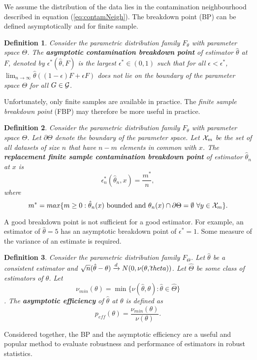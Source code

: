 We assume the distribution of the data lies in the contamination neighbourhood described in equation (\ref{eq:contamNeigh}). The breakdown point (BP) can be defined asymptotically and for finite sample.
\newtheorem{defn}{Definition}[section]
\begin{defn}
\label{def:asympBP}
Consider the parametric distribution family $F_\theta$ with parameter space $\Theta$. The \textbf{asymptotic contamination breakdown point} of estimator $\hat \theta$ at $F$, denoted by $\epsilon^*(\hat \theta, F)$ is the largest  $\epsilon^* \in (0,1)$ such that for all $\epsilon < \epsilon^*$, $\lim_{n\xrightarrow{}\infty}\hat\theta((1-\epsilon)F + \epsilon F)$ does not lie on the boundary of the parameter space $\Theta$ for all $G \in \mathcal{G}$. \cite{maronna2019robust}
\end{defn}
Unfortunately, only finite samples are available in practice. The \textit{finite sample breakdown point} (FBP) may therefore be more useful in practice.
\begin{defn}
\label{def:finiteBP}
Consider the parametric distribution family $F_\theta$ with parameter space $\Theta$. Let $\partial \Theta$ denote the boundary of the parameter space. Let $\mathcal{X}_m$ be the set of all datasets of size $n$ that have $n-m$ elements in common with $x$. The \textbf{replacement finite sample contamination breakdown point} of estimator $\hat \theta_n$ at $x$ is $$\epsilon_n^*(\hat \theta_n, x) = \frac{m^*}{n},$$ where
$$m^* = max\{ m \geq 0 : \hat \theta_n(x) \text{ bounded and } \theta_n(x) \cap \partial \Theta = \emptyset\ \forall y \in \mathcal{X}_m\}.$$ \cite{maronna2019robust}
\end{defn}
A good breakdown point is not sufficient for a good estimator. For example, an estimator of $\hat \theta = 5$ has an asymptotic breakdown point of $\epsilon^* = 1$. Some measure of the variance of an estimate is required.
\begin{defn}
\label{def:asympEff}
Consider the parametric distribution family $F_\Theta$. Let $\hat \theta$ be a consistent estimator and $\sqrt{n} (\hat \theta - \theta) \xrightarrow{d} N(0,\nu(\theta,\hat\\theta))$. Let $\hat \Theta$ be some class of estimators of $\theta$. Let
$$\nu_{min}(\theta) = \min\{ \nu(\hat\theta,\theta) : \hat\theta \in \hat\Theta \}$$.
The \textbf{asymptotic efficiency} of $\hat \theta$ at $\theta$ is defined as
$$ p_{eff}(\theta) = \frac{\nu_{min}(\theta)}{\nu(\theta)}. $$
\end{defn}
Considered together, the BP and the asymptotic efficiency are a useful and popular method to evaluate robustness and performance of estimators in robust statistics.

